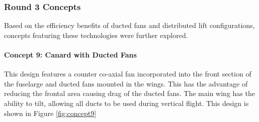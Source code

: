 

\subsubsection{Round 3 Concepts}
Based on the efficiency benefits of ducted fans and distributed lift configurations, concepts featuring these technologies were further explored.

\paragraph{Concept 9: Canard with Ducted Fans}
This design features a counter co-axial fan incorporated into the front section of the fuselarge and ducted fans mounted in the wings. This has the advantage of reducing the frontal area causing drag of the ducted fans. The main wing has the ability to tilt, allowing all ducts to be used during vertical flight. This design is shown in Figure \ref{fig:concept9}

